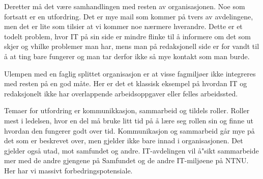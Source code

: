 \documentclass[12pt, a4paper]{article}
\begin{document}
Deretter må det være samhandlingen med resten av organisasjonen. Noe som
fortsatt er en utfordring. Det er mye mail som kommer på tvers av avdelingene,
men det er lite som tilsier at vi kommer noe nærmere hverandre. Dette er et
todelt problem, hvor IT på sin side er mindre flinke til å informere om det som
skjer og vhilke problemer man har, mens man på redaksjonell side er for vandt
til å at ting bare fungerer og man tar derfor ikke så mye kontakt som man
burde.  

Ulempen med en faglig splittet organisasjon er at
visse fagmiljøer ikke integreres med resten på en god måte. Her er det et
klassisk eksempel på hvordan IT og redaksjonelt ikke har overlappende
arbeidsoppgaver eller felles arbeidssted. 

Temaer for utfordring er kommunikkasjon, sammarbeid og tildels roller.
Roller mest i ledelsen, hvor en del må bruke litt tid på å lære seg rollen sin
og finne ut hvordan den fungerer godt over tid. 
Kommunikasjon og sammarbeid går mye på det som er beskrevet over, men gjelder
ikke bare innad i organisasjonen. Det gjelder også utad, mot samfundet og
andre. IT-avdelingen vil å"sikt sammarbeide mer med de andre gjengene på
Samfundet og de andre IT-miljøene på NTNU. Her har vi massivt
forbedringspotensiale.  
\end{document}
